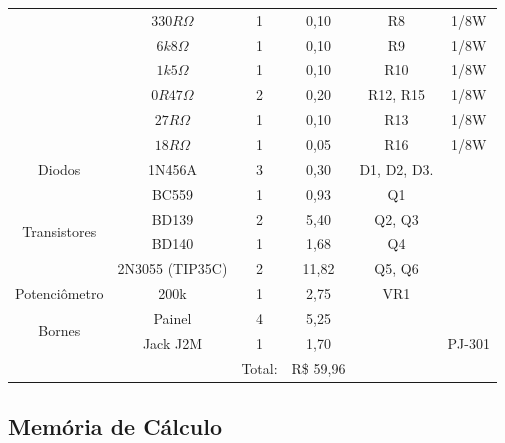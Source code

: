 \documentclass[a4paper,12pt,oneside,openany,table,xcdraw]{article}
\begin{document}
\begin{table}[H]
{\begin{tabular}{cc|c|c|cc}
\multicolumn{1}{|c|}{} & $330R \Omega$ & 1 & 0,10 & \multicolumn{1}{c|}{R8} & \multicolumn{1}{c|}{1/8W} \\ \cline{2-6} 
\multicolumn{1}{|c|}{} & $6k8 \Omega$ & 1 & 0,10 & \multicolumn{1}{c|}{R9} & \multicolumn{1}{c|}{1/8W} \\ \cline{2-6} 
\multicolumn{1}{|c|}{} & $1k5 \Omega$ & 1 & 0,10 & \multicolumn{1}{c|}{R10} & \multicolumn{1}{c|}{1/8W} \\ \cline{2-6} 
\multicolumn{1}{|c|}{} & $0R47 \Omega$ & 2 & 0,20 & \multicolumn{1}{c|}{R12, R15} & \multicolumn{1}{c|}{1/8W} \\ \cline{2-6} 
\multicolumn{1}{|c|}{} & $27R \Omega$ & 1 & 0,10 & \multicolumn{1}{c|}{R13} & \multicolumn{1}{c|}{1/8W} \\ \cline{2-6} 
\multicolumn{1}{|c|}{} & $18R \Omega$ & 1 & 0,05 & \multicolumn{1}{c|}{R16} & \multicolumn{1}{c|}{1/8W} \\ \hline
\multicolumn{1}{|c|}{Diodos} & 1N456A & 3 & 0,30 & \multicolumn{1}{c|}{D1, D2, D3.} & \multicolumn{1}{c|}{} \\ \hline
\multicolumn{1}{|c|}{\multirow{4}{*}{Transistores}} & BC559 & 1 & 0,93 & \multicolumn{1}{c|}{Q1} & \multicolumn{1}{c|}{} \\ \cline{2-6} 
\multicolumn{1}{|c|}{} & BD139 & 2 & 5,40 & \multicolumn{1}{c|}{Q2, Q3} & \multicolumn{1}{c|}{} \\ \cline{2-6} 
\multicolumn{1}{|c|}{} & BD140 & 1 & 1,68 & \multicolumn{1}{c|}{Q4} & \multicolumn{1}{c|}{} \\ \cline{2-6} 
\multicolumn{1}{|c|}{} & 2N3055 (TIP35C) & 2 & 11,82 & \multicolumn{1}{c|}{Q5, Q6} & \multicolumn{1}{c|}{} \\ \hline
\multicolumn{1}{|c|}{Potenciômetro} & 200k & 1 & 2,75 & \multicolumn{1}{c|}{VR1} & \multicolumn{1}{c|}{} \\ \hline
\multicolumn{1}{|c|}{\multirow{2}{*}{Bornes}} & Painel & 4 & 5,25 & \multicolumn{1}{c|}{} & \multicolumn{1}{c|}{} \\ \cline{2-6} 
\multicolumn{1}{|c|}{} & Jack J2M & 1 & 1,70 & \multicolumn{1}{c|}{} & \multicolumn{1}{c|}{PJ-301} \\ \hline
\multicolumn{1}{l}{} &  & Total: & R\$  59,96 &  &  \\ \cline{3-4}
\end{tabular}%
}
\end{table}

\subsection{Memória de Cálculo}
\end{document}
